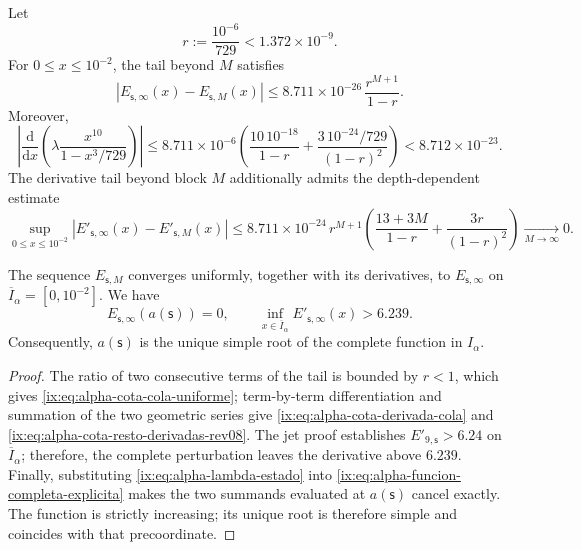 Let
\[
 r:=\frac{10^{-6}}{729}<1.372\mathbin{\times}10^{-9}.
\]
For \(0\leq x\leq10^{-2}\), the tail beyond \(M\) satisfies
\begin{equation}
 \left|E_{\mathsf s,\infty}(x)-E_{\mathsf s,M}(x)\right|
 \leq
 8.711\mathbin{\times}10^{-26}\,\frac{r^{M+1}}{1-r}.
 \label{ix:eq:alpha-cota-cola-uniforme}
\end{equation}
Moreover,
\begin{equation}
 \left|\frac{\mathrm d}{\mathrm dx}
  \left(\lambda\frac{x^{10}}{1-x^3/729}\right)\right|
 \leq 8.711\mathbin{\times}10^{-6}
 \left(\frac{10\,10^{-18}}{1-r}
 +\frac{3\,10^{-24}/729}{(1-r)^2}\right)
 <8.712\mathbin{\times}10^{-23}.
 \label{ix:eq:alpha-cota-derivada-cola}
\end{equation}
The derivative tail beyond block \(M\) additionally admits the
depth-dependent estimate
\begin{equation}
 \sup_{0\le x\le10^{-2}}
 \left|E'_{\mathsf s,\infty}(x)-E'_{\mathsf s,M}(x)\right|
 \le 8.711\mathbin{\times}10^{-24}\,r^{M+1}
 \left(\frac{13+3M}{1-r}+\frac{3r}{(1-r)^2}\right)
 \xrightarrow[M\to\infty]{}0.
 \label{ix:eq:alpha-cota-resto-derivadas-rev08}
\end{equation}

\begin{theorem}
\label{ix:thm:alpha-raiz-completa-explicita}
The sequence \(E_{\mathsf s,M}\) converges uniformly, together with its
derivatives, to \(E_{\mathsf s,\infty}\) on
\(\overline I_\alpha=[0,10^{-2}]\). We have
\begin{equation}
 E_{\mathsf s,\infty}(a(\mathsf s))=0,
 \qquad
 \inf_{x\in\overline I_\alpha}
 E'_{\mathsf s,\infty}(x)>6.239.
 \label{ix:eq:alpha-raiz-y-derivada-completas}
\end{equation}
Consequently, \(a(\mathsf s)\) is the unique simple root of the complete
function in \(I_\alpha\).
\end{theorem}

\begin{proof}
The ratio of two consecutive terms of the tail is bounded by \(r<1\),
which gives \eqref{ix:eq:alpha-cota-cola-uniforme}; term-by-term differentiation
and summation of the two geometric series give
\eqref{ix:eq:alpha-cota-derivada-cola} and
\eqref{ix:eq:alpha-cota-resto-derivadas-rev08}. The jet proof establishes
\(E'_{9,\mathsf s}>6.24\) on \(\overline I_\alpha\); therefore, the
complete perturbation leaves the derivative above \(6.239\).
Finally, substituting \eqref{ix:eq:alpha-lambda-estado} into
\eqref{ix:eq:alpha-funcion-completa-explicita} makes the two summands evaluated at
\(a(\mathsf s)\) cancel exactly. The function is strictly
increasing; its unique root is therefore simple and coincides with that precoordinate.
\end{proof}

